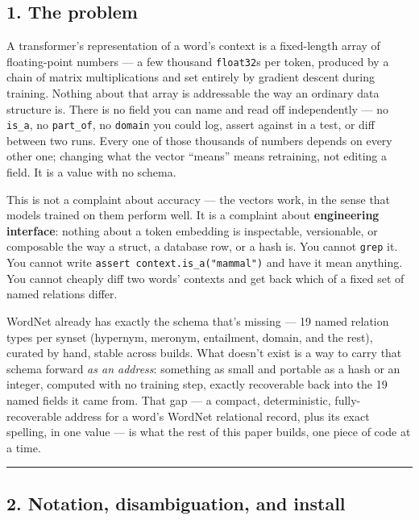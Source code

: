 \documentclass[
  10pt,
]{article}
\begin{document}
\hypertarget{the-problem}{%
\subsection{1. The problem}\label{the-problem}}

A transformer's representation of a word's context is a fixed-length
array of floating-point numbers --- a few thousand \texttt{float32}s per
token, produced by a chain of matrix multiplications and set entirely by
gradient descent during training. Nothing about that array is
addressable the way an ordinary data structure is. There is no field you
can name and read off independently --- no \texttt{is\_a}, no
\texttt{part\_of}, no \texttt{domain} you could log, assert against in a
test, or diff between two runs. Every one of those thousands of numbers
depends on every other one; changing what the vector ``means'' means
retraining, not editing a field. It is a value with no schema.

This is not a complaint about accuracy --- the vectors work, in the
sense that models trained on them perform well. It is a complaint about
\textbf{engineering interface}: nothing about a token embedding is
inspectable, versionable, or composable the way a struct, a database
row, or a hash is. You cannot \texttt{grep} it. You cannot write
\texttt{assert\ context.is\_a("mammal")} and have it mean anything. You
cannot cheaply diff two words' contexts and get back which of a fixed
set of named relations differ.

WordNet already has exactly the schema that's missing --- 19 named
relation types per synset (hypernym, meronym, entailment, domain, and
the rest), curated by hand, stable across builds. What doesn't exist is
a way to carry that schema forward \emph{as an address}: something as
small and portable as a hash or an integer, computed with no training
step, exactly recoverable back into the 19 named fields it came from.
That gap --- a compact, deterministic, fully-recoverable address for a
word's WordNet relational record, plus its exact spelling, in one value
--- is what the rest of this paper builds, one piece of code at a time.

\begin{center}\rule{0.5\linewidth}{0.5pt}\end{center}

\hypertarget{notation-disambiguation-and-install}{%
\subsection{2. Notation, disambiguation, and
install}\label{notation-disambiguation-and-install}}
\end{document}
